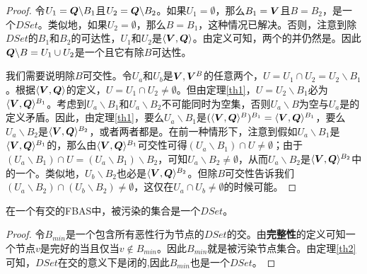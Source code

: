 \begin{proof}
	令$U_1={\bm Q}\backslash B_1$且$U_2={\bm Q}\backslash B_2$。如果$U_1=\emptyset$，那么$B_1={\bm V}$且$B=B_2$，是一个$DSet$。类似地，如果$U_2=\emptyset$，那么$B=B_1$，这种情况已解决。否则，注意到除$DSet$的$B_1$和$B_2$的{\quorum}可达性，$U_1$和$U_2$是$\langle{\bm V},{\bm Q}\rangle$。由定义可知，两个{\quorum}的并仍然是{\quorum}。因此${{\bm Q}\backslash B}=U_1\cup U_2$是一个{\quorum}且它有除$B${\quorum}可达性。
	
	我们需要说明除$B${\quorum}可交性。令$U_a$和$U_b$是${{\bm V},{\bm V}^{B}}$的任意两个{\quorum}，$U=U_1\cap U_2 = U_2\backslash B_1$。根据$\langle{\bm V},{\bm Q}\rangle$的定义，$U=U_1\cap U_2  \neq \emptyset$。但由定理\ref{th1}，$U=U_2\backslash B_1$必为$\langle{\bm V},{\bm Q}\rangle^{B_1}$。考虑到$U_a\backslash B_1$和$U_a\backslash B_2$不可能同时为空集，否则$U_a\backslash B$为空与$U_a$是{\quorum}的定义矛盾。因此，由定理\ref{th1}，要么$U_a\backslash B_1$是$(\langle{\bm V},{\bm Q}\rangle^{B})^{B_1}=\langle{\bm V},{\bm Q}\rangle^{B_1}$，要么$U_a\backslash B_2$是$\langle{\bm V},{\bm Q}\rangle^{B_2}$，或者两者都是。在前一种情形下，注意到假如$U_a\backslash B_1$是$\langle{\bm V},{\bm Q}\rangle^{B_1}$的{\quorum}，那么由$\langle{\bm V},{\bm Q}\rangle^{B_1}${\quorum}可交性可得$(U_a\backslash B_1)\cap U\neq \emptyset$；由于$(U_a\backslash B_1)\cap U = (U_a\backslash B_1)\backslash B_2$，可知$U_a\backslash B_2\neq \emptyset$，从而$U_a\backslash B_2$是$\langle{\bm V},{\bm Q}\rangle^{B_2}$中的一个{\quorum}。类似地，$U_b\backslash B_2$也必是$\langle{\bm V},{\bm Q}\rangle^{B_2}$。但除$B${\quorum}可交性告诉我们$(U_a\backslash B_2)\cap (U_b\backslash B_2)\neq \emptyset$，这仅在$U_a\cap U_b\neq \emptyset$的时候可能。
\end{proof}

\begin{theorem}\label{th3}
	在一个有{\quorum}交的FBAS中，被污染的集合是一个$DSet$。
\end{theorem}

\begin{proof}
	令$B_{min}$是一个包含所有恶性行为节点的$DSet$的交。由\textbf{完整性}的定义可知一个节点$v$是完好的当且仅当$v\not\in B_{min}$。因此$B_{min}$就是被污染节点集合。由定理\ref{th2}可知，$DSet$在交的意义下是闭的,因此$B_{min}$也是一个$DSet$。
\end{proof}